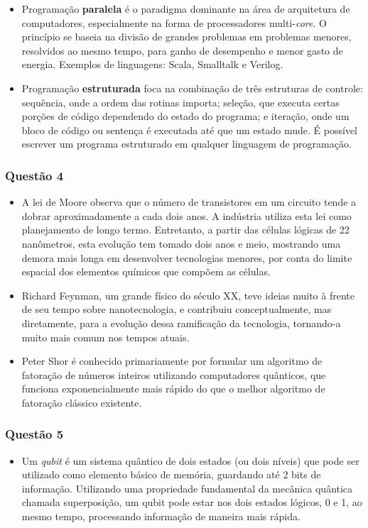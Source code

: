 \documentclass{../sftex/sftex}
\begin{document}
\begin{itemize}
    \item Programação \textbf{paralela} é o paradigma dominante na área de
    arquitetura de computadores, especialmente na forma de processadores
    multi-\emph{core}. O princípio se baseia na divisão de grandes problemas em
    problemas menores, resolvidos ao mesmo tempo, para ganho de desempenho e
    menor gasto de energia. Exemplos de linguagens: Scala, Smalltalk e Verilog.

    \item Programação \textbf{estruturada} foca na combinação de três estruturas
    de controle: sequência, onde a ordem das rotinas importa; seleção, que
    executa certas porções de código dependendo do estado do programa; e
    iteração, onde um bloco de código ou sentença é executada até que um estado
    mude. É possível escrever um programa estruturado em qualquer linguagem de
    programação.
\end{itemize}

\newpage

\subsubsection*{Questão 4}
\begin{itemize}
    \item A lei de Moore observa que o número de transistores em um circuito
    tende a dobrar aproximadamente a cada dois anos. A indústria utiliza esta
    lei como planejamento de longo termo. Entretanto, a partir das células
    lógicas de 22 nanômetros, esta evolução tem tomado dois anos e meio,
    mostrando uma demora mais longa em desenvolver tecnologias menores, por
    conta do limite espacial dos elementos químicos que compõem as células.

    \item Richard Feynman, um grande físico do século XX, teve ideias muito à
    frente de seu tempo sobre nanotecnologia, e contribuiu conceptualmente, mas
    diretamente, para a evolução dessa ramificação da tecnologia, tornando-a
    muito mais comum nos tempos atuais.

    \item Peter Shor é conhecido primariamente por formular um algoritmo de
    fatoração de números inteiros utilizando computadores quânticos, que
    funciona exponencialmente mais rápido do que o melhor algoritmo de
    fatoração clássico existente.
\end{itemize}

\subsubsection*{Questão 5}
\begin{itemize}
    \item Um \emph{qubit} é um sistema quântico de dois estados (ou dois
    níveis) que pode ser utilizado como elemento básico de memória, guardando
    até 2 bits de informação. Utilizando uma propriedade fundamental da mecânica
    quântica chamada superposição, um qubit pode estar nos dois estados lógicos,
    0 e 1, ao mesmo tempo, processando informação de maneira mais rápida.
\end{itemize}
\end{document}
